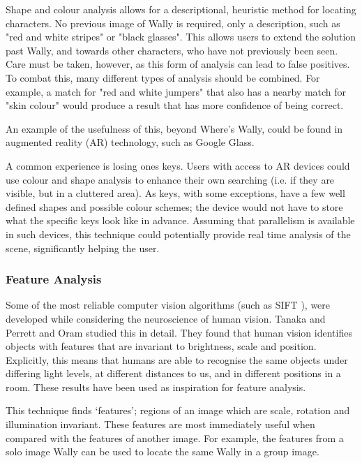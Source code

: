 \documentclass[../main.tex]{subfiles}
\begin{document}
      Shape and colour analysis allows for a descriptional, heuristic method for locating characters.
      No previous image of Wally is required, only a description, such as "red and white stripes" or "black glasses".
      This allows users to extend the solution past Wally, and towards other characters, who have not previously been seen.
      Care must be taken, however, as this form of analysis can lead to false positives.
      To combat this, many different types of analysis should be combined.
      For example, a match for "red and white jumpers" that also has a nearby match for "skin colour" would produce a result that has more confidence of being correct.

      An example of the usefulness of this, beyond Where's Wally, could be found in augmented reality (AR) technology, such as Google Glass.

      A common experience is losing ones keys.
      Users with access to AR devices could use colour and shape analysis to enhance their own searching (i.e. if they are visible, but in a cluttered area).
      As keys, with some exceptions, have a few well defined shapes and possible colour schemes; the device would not have to store what the specific keys look like in advance.
      Assuming that parallelism is available in such devices, this technique could potentially provide real time analysis of the scene, significantly helping the user.
    \subsubsection{Feature Analysis}
      Some of the most reliable computer vision algorithms (such as SIFT \cite{sift}), were developed while considering the neuroscience of human vision.
      Tanaka\cite{mechobjrecog} and Perrett and Oram\cite{perretthv} studied this in detail.
      They found that human vision identifies objects with features that are invariant to brightness, scale and position.
      Explicitly, this means that humans are able to recognise the same objects under differing light levels, at different distances to us, and in different positions in a room.
      These results have been used as inspiration for feature analysis.

      This technique finds `features'; regions of an image which are scale, rotation and illumination invariant.
      These features are most immediately useful when compared with the features of another image.
      For example, the features from a solo image Wally can be used to locate the same Wally in a group image.
\end{document}
